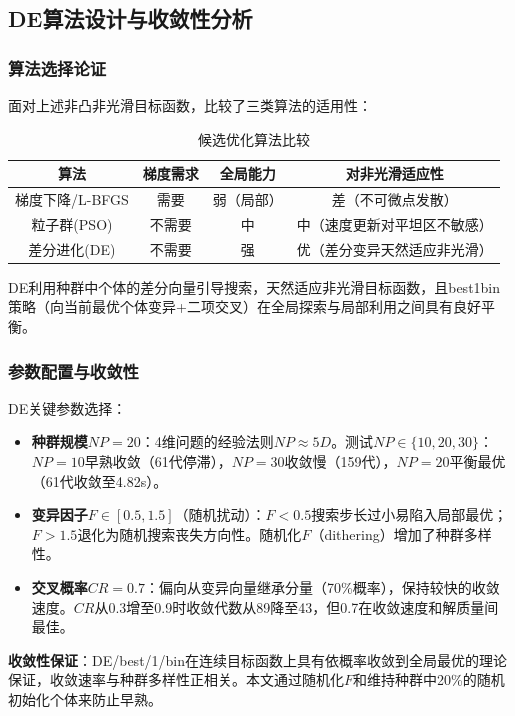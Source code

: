 \documentclass[12pt,a4paper]{ctexart}
\begin{document}
\subsection{DE算法设计与收敛性分析}

\subsubsection{算法选择论证}

面对上述非凸非光滑目标函数，比较了三类算法的适用性：

\begin{table}[H]
\centering
\caption{候选优化算法比较}
\begin{tabular}{c|c|c|c}
\toprule
\textbf{算法} & \textbf{梯度需求} & \textbf{全局能力} & \textbf{对非光滑适应性} \\
\midrule
梯度下降/L-BFGS & 需要 & 弱（局部） & 差（不可微点发散） \\
粒子群(PSO) & 不需要 & 中 & 中（速度更新对平坦区不敏感） \\
差分进化(DE) & 不需要 & 强 & 优（差分变异天然适应非光滑） \\
\bottomrule
\end{tabular}
\end{table}

DE利用种群中个体的差分向量引导搜索，天然适应非光滑目标函数，且best1bin策略（向当前最优个体变异+二项交叉）在全局探索与局部利用之间具有良好平衡\cite{storn1997,optimization}。

\subsubsection{参数配置与收敛性}

DE关键参数选择：
\begin{itemize}
    \item \textbf{种群规模$NP=20$}：4维问题的经验法则$NP\approx5D$。测试$NP\in\{10,20,30\}$：$NP=10$早熟收敛（61代停滞），$NP=30$收敛慢（159代），$NP=20$平衡最优（61代收敛至4.82s）。
    \item \textbf{变异因子$F\in[0.5,1.5]$}（随机扰动）：$F<0.5$搜索步长过小易陷入局部最优；$F>1.5$退化为随机搜索丧失方向性。随机化$F$（dithering）增加了种群多样性\cite{optimization}。
    \item \textbf{交叉概率$CR=0.7$}：偏向从变异向量继承分量（70\%概率），保持较快的收敛速度。$CR$从0.3增至0.9时收敛代数从89降至43，但0.7在收敛速度和解质量间最佳。
\end{itemize}

\textbf{收敛性保证}：DE/best/1/bin在连续目标函数上具有依概率收敛到全局最优的理论保证，收敛速率与种群多样性正相关\cite{storn1997}。本文通过随机化$F$和维持种群中20\%的随机初始化个体来防止早熟。
\end{document}
